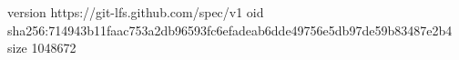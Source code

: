 version https://git-lfs.github.com/spec/v1
oid sha256:714943b11faac753a2db96593fc6efadeab6dde49756e5db97de59b83487e2b4
size 1048672
